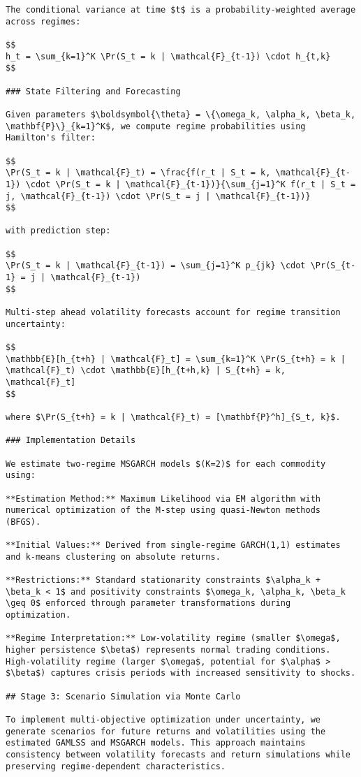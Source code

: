 \documentclass[
  10pt,
  a4paper,
]{article}
\begin{document}
\begin{tcolorbox}
\begin{verbatim}
The conditional variance at time $t$ is a probability-weighted average across regimes:

$$
h_t = \sum_{k=1}^K \Pr(S_t = k | \mathcal{F}_{t-1}) \cdot h_{t,k}
$$

### State Filtering and Forecasting

Given parameters $\boldsymbol{\theta} = \{\omega_k, \alpha_k, \beta_k, \mathbf{P}\}_{k=1}^K$, we compute regime probabilities using Hamilton's filter:

$$
\Pr(S_t = k | \mathcal{F}_t) = \frac{f(r_t | S_t = k, \mathcal{F}_{t-1}) \cdot \Pr(S_t = k | \mathcal{F}_{t-1})}{\sum_{j=1}^K f(r_t | S_t = j, \mathcal{F}_{t-1}) \cdot \Pr(S_t = j | \mathcal{F}_{t-1})}
$$

with prediction step:

$$
\Pr(S_t = k | \mathcal{F}_{t-1}) = \sum_{j=1}^K p_{jk} \cdot \Pr(S_{t-1} = j | \mathcal{F}_{t-1})
$$

Multi-step ahead volatility forecasts account for regime transition uncertainty:

$$
\mathbb{E}[h_{t+h} | \mathcal{F}_t] = \sum_{k=1}^K \Pr(S_{t+h} = k | \mathcal{F}_t) \cdot \mathbb{E}[h_{t+h,k} | S_{t+h} = k, \mathcal{F}_t]
$$

where $\Pr(S_{t+h} = k | \mathcal{F}_t) = [\mathbf{P}^h]_{S_t, k}$.

### Implementation Details

We estimate two-regime MSGARCH models $(K=2)$ for each commodity using:

**Estimation Method:** Maximum Likelihood via EM algorithm with numerical optimization of the M-step using quasi-Newton methods (BFGS).

**Initial Values:** Derived from single-regime GARCH(1,1) estimates and k-means clustering on absolute returns.

**Restrictions:** Standard stationarity constraints $\alpha_k + \beta_k < 1$ and positivity constraints $\omega_k, \alpha_k, \beta_k \geq 0$ enforced through parameter transformations during optimization.

**Regime Interpretation:** Low-volatility regime (smaller $\omega$, higher persistence $\beta$) represents normal trading conditions. High-volatility regime (larger $\omega$, potential for $\alpha$ > $\beta$) captures crisis periods with increased sensitivity to shocks.

## Stage 3: Scenario Simulation via Monte Carlo

To implement multi-objective optimization under uncertainty, we generate scenarios for future returns and volatilities using the estimated GAMLSS and MSGARCH models. This approach maintains consistency between volatility forecasts and return simulations while preserving regime-dependent characteristics.


\end{verbatim}
\end{tcolorbox}
\end{document}
